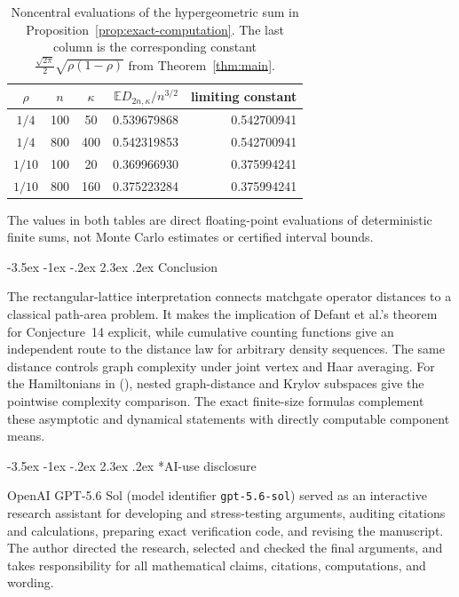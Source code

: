 \documentclass[twoside,10pt]{article}
\makeatletter
\numberwithin{equation}{section}
\theoremstyle{slbody}
\theoremstyle{definition}
\theoremstyle{remark}
\newcommand{\E}{\mathbb{E}}
\newcommand{\1}{\mathbf{1}}
\renewcommand{\section}{%
  \@startsection{section}{1}{\z@}%
    {-3.5ex \@plus -1ex \@minus -.2ex}%
    {2.3ex \@plus .2ex}%
    {\normalfont\large\bfseries}}
\renewcommand{\eqref}[1]{%
  \textup{{\normalfont(\oldstylenums{\ref{#1}}}\normalfont)}}
\makeatother
\begin{document}
\begin{table}[!htbp]
\centering
\small
\begin{tabular}{cccr@{\qquad}r}
$\rho$ & $n$ & $\kappa$ & $\E D_{2n,\kappa}/n^{3/2}$
& limiting constant\\
\hline
$1/4$  & 100 & 50  & 0.539679868 & 0.542700941\\
$1/4$  & 800 & 400 & 0.542319853 & 0.542700941\\
$1/10$ & 100 & 20  & 0.369966930 & 0.375994241\\
$1/10$ & 800 & 160 & 0.375223284 & 0.375994241
\end{tabular}
\caption{Noncentral evaluations of the hypergeometric sum in
Proposition~\ref{prop:exact-computation}.  The last column is the corresponding
constant $\frac{\sqrt{2\pi}}2\sqrt{\rho(1-\rho)}$ from
Theorem~\ref{thm:main}.}
\label{tab:noncentral}
\end{table}
The values in both tables are direct floating-point evaluations of
deterministic finite sums, not Monte Carlo estimates or certified interval
bounds.

\section{Conclusion}

The rectangular-lattice interpretation connects matchgate operator distances
to a classical path-area problem.  It makes the implication of Defant et al.'s
theorem for Conjecture~14 explicit, while cumulative counting functions give
an independent route to the distance law for arbitrary density sequences.
The same distance controls graph complexity under joint vertex and Haar
averaging.  For the Hamiltonians in \eqref{eq:matchgate-Hamiltonian}, nested
graph-distance and Krylov subspaces give the pointwise complexity comparison.
The exact finite-size formulas complement these asymptotic and dynamical
statements with directly computable component means.

\section*{AI-use disclosure}

OpenAI GPT-5.6 Sol (model identifier \texttt{gpt-5.6-sol}) served as an
interactive research assistant for developing and stress-testing arguments,
auditing citations and calculations, preparing exact verification code, and
revising the manuscript.  The author directed the research, selected and
checked the final arguments, and takes responsibility for all mathematical
claims, citations, computations, and wording.
\end{document}
